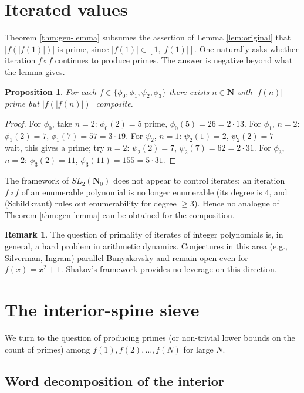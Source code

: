\documentclass[11pt]{article}
\newtheorem{proposition}[theorem]{Proposition}
\theoremstyle{definition}
\newtheorem{remark}[theorem]{Remark}
\newcommand{\N}{\mathbf{N}}
\newcommand{\Nz}{\mathbf{N}_0}
\newcommand{\SLNz}{SL_2(\Nz)}
\begin{document}
\section{Iterated values}\label{sec:iterates}

Theorem \ref{thm:gen-lemma} subsumes the assertion of Lemma \ref{lem:original} that $|f(|f(1)|)|$ is prime, since $|f(1)| \in [1,|f(1)|]$. One naturally asks whether iteration $f \circ f$ continues to produce primes. The answer is negative beyond what the lemma gives.

\begin{proposition}\label{prop:iterates-fail}
For each $f \in \{\phi_0,\phi_1,\psi_2,\phi_3\}$ there exists $n \in \N$ with $|f(n)|$ prime but $|f(|f(n)|)|$ composite.
\end{proposition}

\begin{proof}
For $\phi_0$, take $n=2$: $\phi_0(2)=5$ prime, $\phi_0(5)=26 = 2\cdot 13$. For $\phi_1$, $n=2$: $\phi_1(2)=7$, $\phi_1(7)=57=3\cdot 19$. For $\psi_2$, $n=1$: $\psi_2(1)=2$, $\psi_2(2)=7$ — wait, this gives a prime; try $n=2$: $\psi_2(2)=7$, $\psi_2(7)=62=2\cdot 31$. For $\phi_3$, $n=2$: $\phi_3(2)=11$, $\phi_3(11)=155=5\cdot 31$.
\end{proof}

The framework of $\SLNz$ does not appear to control iterates: an iteration $f \circ f$ of an enumerable polynomial is no longer enumerable (its degree is $4$, and \cite[Lemma 2.18]{shakov} (Schildkraut) rules out enumerability for degree $\ge 3$). Hence no analogue of Theorem \ref{thm:gen-lemma} can be obtained for the composition.

\begin{remark}
The question of primality of iterates of integer polynomials is, in general, a hard problem in arithmetic dynamics. Conjectures in this area (e.g., Silverman, Ingram) parallel Bunyakovsky and remain open even for $f(x) = x^2+1$. Shakov's framework provides no leverage on this direction.
\end{remark}

\section{The interior-spine sieve}\label{sec:spine-sieve}

We turn to the question of producing primes (or non-trivial lower bounds on the count of primes) among $f(1),f(2),\dots,f(N)$ for large $N$.

\subsection{Word decomposition of the interior}
\end{document}
